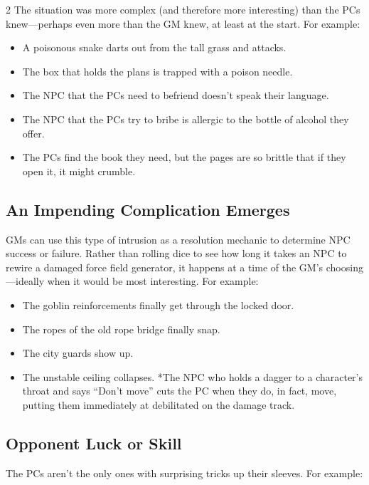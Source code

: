 \begin{multicols}{2}
The situation was more complex (and therefore more interesting) than the PCs knew—perhaps even more than the GM knew, at least at the start. For example:

\begin{itemize}
\item A poisonous snake darts out from the tall grass and attacks.
\item The box that holds the plans is trapped with a poison needle.
\item The NPC that the PCs need to befriend doesn’t speak their language.
\item The NPC that the PCs try to bribe is allergic to the bottle of alcohol they offer.
\item The PCs find the book they need, but the pages are so brittle that if they open it, it might crumble.
\end{itemize}

\subsection{An Impending Complication Emerges}

GMs can use this type of intrusion as a resolution mechanic to determine NPC success or failure. Rather than rolling dice to see how long it takes an NPC to rewire a damaged force field generator, it happens at a time of the GM’s choosing—ideally when it would be most interesting. For example:

\begin{itemize}
\item The goblin reinforcements finally get through the locked door.
\item The ropes of the old rope bridge finally snap.
\item The city guards show up.
\item The unstable ceiling collapses.
*The NPC who holds a dagger to a character’s throat and says “Don’t move” cuts the PC when they do, in fact, move, putting them immediately at debilitated on the damage track.
\end{itemize}

\subsection{Opponent Luck or Skill}

The PCs aren’t the only ones with surprising tricks up their sleeves. For example:


\end{multicols}
